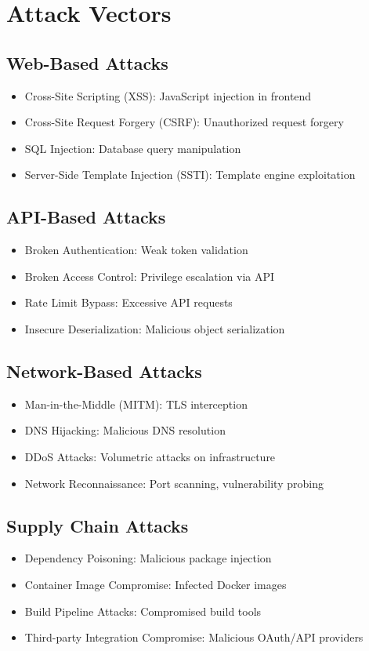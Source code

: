 \documentclass{report}
\begin{document}
\section{Attack Vectors}

\subsection{Web-Based Attacks}
\begin{itemize}
\item Cross-Site Scripting (XSS): JavaScript injection in frontend
\item Cross-Site Request Forgery (CSRF): Unauthorized request forgery
\item SQL Injection: Database query manipulation
\item Server-Side Template Injection (SSTI): Template engine exploitation
\end{itemize}

\subsection{API-Based Attacks}
\begin{itemize}
\item Broken Authentication: Weak token validation
\item Broken Access Control: Privilege escalation via API
\item Rate Limit Bypass: Excessive API requests
\item Insecure Deserialization: Malicious object serialization
\end{itemize}

\subsection{Network-Based Attacks}
\begin{itemize}
\item Man-in-the-Middle (MITM): TLS interception
\item DNS Hijacking: Malicious DNS resolution
\item DDoS Attacks: Volumetric attacks on infrastructure
\item Network Reconnaissance: Port scanning, vulnerability probing
\end{itemize}

\subsection{Supply Chain Attacks}
\begin{itemize}
\item Dependency Poisoning: Malicious package injection
\item Container Image Compromise: Infected Docker images
\item Build Pipeline Attacks: Compromised build tools
\item Third-party Integration Compromise: Malicious OAuth/API providers
\end{itemize}
\end{document}
